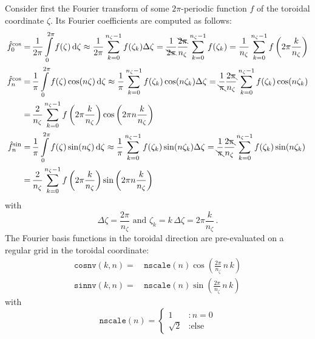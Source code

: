 Consider first the Fourier transform of some $2 \pi$-periodic function $f$ of the toroidal coordinate $\zeta$.
Its Fourier coefficients are computed as follows:
\begin{align}
  \hat{f}^\mathrm{cos}_0
  =&\, \frac{1}{2 \pi} \int\limits_0^{2\pi} f(\zeta) \,\mathrm{d}\zeta
    \approx \frac{1}{2 \pi} \sum\limits_{k=0}^{n_\zeta-1} f(\zeta_k) \Delta \zeta
  = \frac{1}{\bcancel{2 \pi}} \frac{\bcancel{2 \pi}}{n_\zeta} \sum\limits_{k=0}^{n_\zeta-1} f(\zeta_k)
  = \frac{1}{n_\zeta} \sum\limits_{k=0}^{n_\zeta-1} f\left(2 \pi \frac{k}{n_\zeta}\right) \\
  \hat{f}^\mathrm{cos}_n
  =&\, \frac{1}{\pi} \int\limits_0^{2\pi} f(\zeta) \cos(n \zeta) \,\mathrm{d}\zeta
    \approx \frac{1}{\pi} \sum\limits_{k=0}^{n_\zeta-1} f(\zeta_k) \cos(n \zeta_k) \Delta \zeta
  = \frac{1}{\bcancel{\pi}} \frac{2 \bcancel{\pi}}{n_\zeta} \sum\limits_{k=0}^{n_\zeta-1} f(\zeta_k) \cos(n \zeta_k) \nonumber \\
  =&\, \frac{2}{n_\zeta} \sum\limits_{k=0}^{n_\zeta-1} f\left(2 \pi \frac{k}{n_\zeta}\right) \cos\left(2 \pi n \frac{k}{n_\zeta}\right) \\
  \hat{f}^\mathrm{sin}_n
  =&\, \frac{1}{\pi} \int\limits_0^{2\pi} f(\zeta) \sin(n \zeta) \,\mathrm{d}\zeta
    \approx \frac{1}{\pi} \sum\limits_{k=0}^{n_\zeta-1} f(\zeta_k) \sin(n \zeta_k) \Delta \zeta
  = \frac{1}{\bcancel{\pi}} \frac{2 \bcancel{\pi}}{n_\zeta} \sum\limits_{k=0}^{n_\zeta-1} f(\zeta_k) \sin(n \zeta_k) \nonumber \\
  =&\, \frac{2}{n_\zeta} \sum\limits_{k=0}^{n_\zeta-1} f\left(2 \pi \frac{k}{n_\zeta}\right) \sin\left(2 \pi n \frac{k}{n_\zeta}\right)
\end{align}
with
\begin{equation}
  \Delta \zeta = \frac{2 \pi}{n_\zeta}
  \textrm{ and }
  \zeta_k = k \, \Delta \zeta = 2 \pi \frac{k}{n_\zeta} \, .
\end{equation}
The Fourier basis functions in the toroidal direction are pre-evaluated
on a regular grid in the toroidal coordinate:
\begin{align}
  \texttt{cosnv}(k,n) =&\, \texttt{nscale}(n) \cos\left(\frac{2 \pi}{n_\zeta} \,n \,k\right) \\
  \texttt{sinnv}(k,n) =&\, \texttt{nscale}(n) \sin\left(\frac{2 \pi}{n_\zeta} \,n \,k\right)
\end{align}
with
\begin{equation}
  \texttt{nscale}(n) = \begin{cases}
                               1  &: n=0           \\
                         \sqrt{2} &: \textrm{else}
                       \end{cases}
\end{equation}
